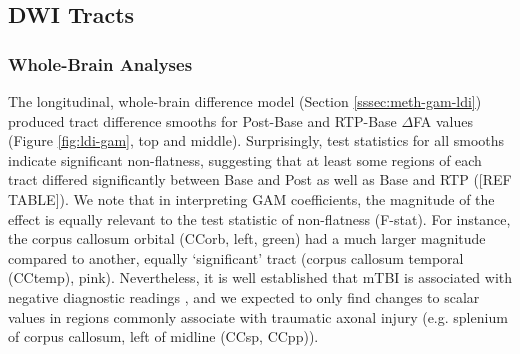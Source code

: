 \documentclass[12pt]{article}
\begin{document}
\subsection{DWI Tracts}
\label{ssec:res-dwi-tract}

\subsubsection{Whole-Brain Analyses}
\label{sssec:res-dwi-tract-wba}
The longitudinal, whole-brain difference model (Section \ref{sssec:meth-gam-ldi}) produced tract difference smooths for Post-Base and RTP-Base $\Delta$FA values (Figure \ref{fig:ldi-gam}, top and middle). Surprisingly, test statistics for all smooths indicate significant non-flatness, suggesting that at least some regions of each tract differed significantly between Base and Post as well as Base and RTP ([REF TABLE]). We note that in interpreting GAM coefficients, the magnitude of the effect is equally relevant to the test statistic of non-flatness (F-stat). For instance, the corpus callosum orbital (CCorb, left, green) had a much larger magnitude compared to another, equally `significant' tract (corpus callosum temporal (CCtemp), pink). Nevertheless, it is well established that mTBI is associated with negative diagnostic readings \parencite[e.g.][]{klein2019PrevalencePotentiallyClinically}, and we expected to only find changes to scalar values in regions commonly associate with traumatic axonal injury (e.g. splenium of corpus callosum, left of midline (CCsp, CCpp)).
\end{document}
